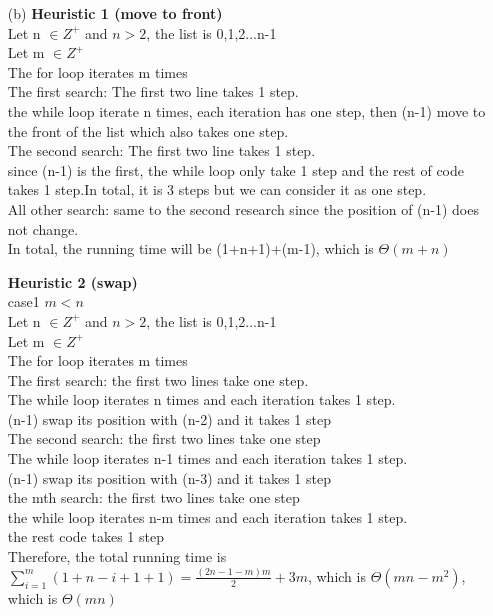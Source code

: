 \documentclass[fontsize=11pt]{article}
\begin{document}
\begin{enumerate}
\begin{enumerate}
            \item[(b)]
            \textbf{Heuristic 1 (move to front)}\\
            Let n $\in Z^+$ and $n>2$, the list is 0,1,2...n-1\\
            Let m $\in Z^+$\\
            The for loop iterates m times\\
            The first search: The first two line takes 1 step.\\
            the while loop iterate n times, each iteration has one step, then (n-1) move to the front of the list which also takes one step.\\
            The second search: The first two line takes 1 step.\\
            since (n-1) is the first, the while loop only take 1 step and the rest of code takes 1 step.In total, it is 3 steps but we can consider it as one step.\\
            All other search: same to the second research since the position of (n-1) does not change. \\
            In total, the running time will be (1+n+1)+(m-1), which is $\Theta({m+n})$

            \textbf{Heuristic 2 (swap)}\\
            case1 $m<n$\\
            Let n $\in Z^+$ and $n>2$, the list is 0,1,2...n-1\\
            Let m $\in Z^+$\\
            The for loop iterates m times\\
            The first search: the first two lines take one step.\\
            The while loop iterates n times and each iteration takes 1 step.\\
            (n-1) swap its position with (n-2) and it takes 1 step\\
            The second search: the first two lines take one step\\
            The while loop iterates n-1 times and each iteration takes 1 step.\\
            (n-1) swap its position with (n-3) and it takes 1 step\\
            the mth search: the first two lines take one step\\
            the while loop iterates n-m times and each iteration takes 1 step.\\
            the rest code takes 1 step\\
            Therefore, the total running time is $\sum_{i=1}^{m} (1+n-i+1+1) = \frac{(2n-1-m)m}{2}+3m$, which is $\Theta({mn-m^{2}})$, which is $\Theta(mn)$


\end{enumerate}
\end{enumerate}
\end{document}
